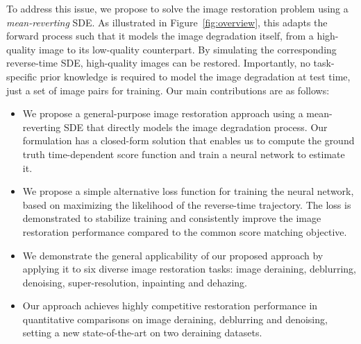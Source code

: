 \documentclass{article}
\theoremstyle{plain}
\theoremstyle{definition}
\theoremstyle{remark}
\begin{document}
To address this issue, we propose to solve the image restoration problem using a \emph{mean-reverting} SDE. As illustrated in Figure~\ref{fig:overview}, this adapts the forward process such that it models the image degradation itself, from a high-quality image to its low-quality counterpart. By simulating the corresponding reverse-time SDE, high-quality images can be restored. Importantly, no task-specific prior knowledge is required to model the image degradation at test time, just a set of image pairs for training. Our main contributions are as follows:
\begin{itemize}
    \item We propose a general-purpose image restoration approach using a mean-reverting SDE that directly models the image degradation process. Our formulation has a closed-form solution that enables us to compute the ground truth time-dependent score function and train a neural network to estimate it.

    \item We propose a simple alternative loss function for training the neural network, based on maximizing the likelihood of the reverse-time trajectory. The loss is demonstrated to stabilize training and consistently improve the image restoration performance compared to the common score matching objective.

    \item We demonstrate the general applicability of our proposed approach by applying it to six diverse image restoration tasks: image deraining, deblurring, denoising, super-resolution, inpainting and dehazing.

    \item Our approach achieves highly competitive restoration performance in quantitative comparisons on image deraining, deblurring and denoising, setting a new state-of-the-art on two deraining datasets.
\end{itemize}
\end{document}
